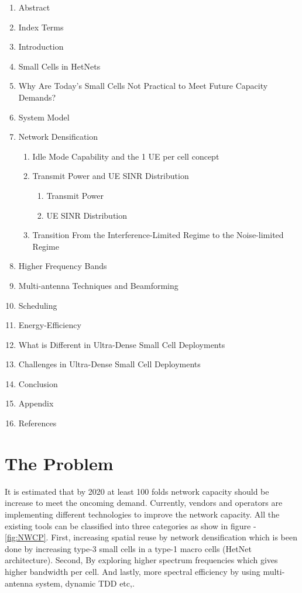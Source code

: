 \documentclass[12pt,onecolumn]{IEEEtran}
\begin{document}
 \renewcommand{\theenumi}{\Roman{enumi}}
 \begin{enumerate}
   \item Abstract
   \item Index Terms
   \item Introduction
   \item Small Cells in HetNets
   \item Why Are Today's Small Cells Not Practical to Meet Future Capacity Demands?
   \item System Model
   \item Network Densification
   \begin{enumerate}
     \item Idle Mode Capability and the 1 UE per cell concept
     \item Transmit Power and UE SINR Distribution
     \begin{enumerate}
     \item Transmit Power
     \item UE SINR Distribution
     \end{enumerate}
     \item Transition From the Interference-Limited Regime to the Noise-limited Regime
     \end{enumerate}
   \item Higher Frequency Bands
   \item Multi-antenna Techniques and Beamforming
   \item Scheduling
   \item Energy-Efficiency
   \item What is Different in Ultra-Dense Small Cell Deployments
   \item Challenges in Ultra-Dense Small Cell Deployments
   \item Conclusion
   \item Appendix
   \item References
 \end{enumerate}

\section{The Problem}
\label{sec:TP}
It is estimated that by 2020 at least 100 folds network capacity should be increase to meet the oncoming demand. Currently, vendors and operators are implementing different technologies to improve the network capacity. All the existing tools can be classified into three categories as show in figure - \ref{fig:NWCP}. First, increasing spatial reuse by network densification  which is been done by increasing type-3 small cells in a type-1 macro cells (HetNet architecture). Second, By exploring higher spectrum frequencies which gives higher bandwidth per cell. And lastly, more spectral efficiency by using multi-antenna system, dynamic TDD etc,. 
\end{document}
